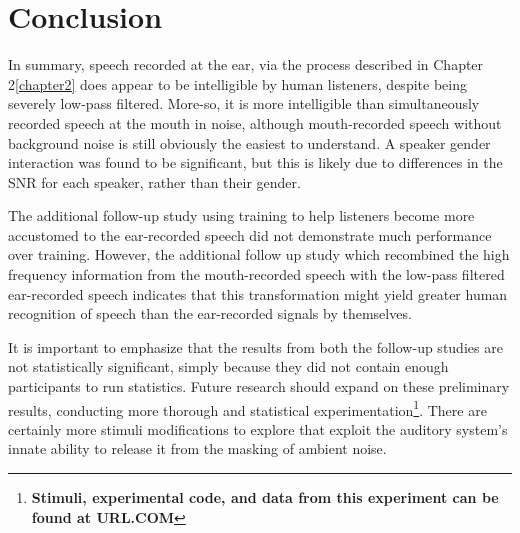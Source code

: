 \documentclass[dissertation,copyright]{uathesis}
\begin{document}
\section{Conclusion}

In summary, speech recorded at the ear, via the process described in Chapter 2\ref{chapter2} does appear to be intelligible by human listeners, despite being severely low-pass filtered.  More-so, it is more intelligible than simultaneously recorded speech at the mouth in noise, although mouth-recorded speech without background noise is still obviously the easiest to understand.  A speaker gender interaction was found to be significant, but this is likely due to differences in the SNR for each speaker, rather than their gender.  

The additional follow-up study using training to help listeners become more accustomed to the ear-recorded speech did not demonstrate much performance over training.  However, the additional follow up study which recombined the high frequency information from the mouth-recorded speech with the low-pass filtered ear-recorded speech indicates that this transformation might yield greater human recognition of speech than the ear-recorded signals by themselves.

It is important to emphasize that the results from both the follow-up studies are not statistically significant, simply because they did not contain enough participants to run statistics.  Future research should expand on these preliminary results, conducting more thorough and statistical experimentation\footnote{\textbf{Stimuli, experimental code, and data from this experiment can be found at URL.COM}}.  There are certainly more stimuli modifications to explore that exploit the auditory system's innate ability to release it from the masking of ambient noise.



\end{document}
